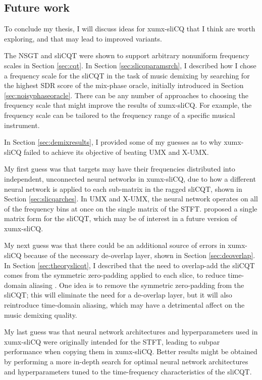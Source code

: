 \documentclass[report.tex]{subfiles}
\begin{document}
\subsection{Future work}

\begin{shaded}

To conclude my thesis, I will discuss ideas for xumx-sliCQ that I think are worth exploring, and that may lead to improved variants.

The NSGT and sliCQT were shown to support arbitrary nonuniform frequency scales in Section \ref{sec:cqt}. In Section \ref{sec:slicqparamsrch}, I described how I chose a frequency scale for the sliCQT in the task of music demixing by searching for the highest SDR score of the mix-phase oracle, initially introduced in Section \ref{sec:noisyphaseoracle}. There can be any number of approaches to choosing the frequency scale that might improve the results of xumx-sliCQ. For example, the frequency scale can be tailored to the frequency range of a specific musical instrument.

In Section \ref{sec:demixresults}, I provided some of my guesses as to why xumx-sliCQ failed to achieve its objective of beating UMX and X-UMX.

My first guess was that targets may have their frequencies distributed into independent, unconnected neural networks in xumx-sliCQ, due to how a different neural network is applied to each sub-matrix in the ragged sliCQT, shown in Section \ref{sec:slicqarches}. In UMX and X-UMX, the neural network operates on all of the frequency bins at once on the single matrix of the STFT. \textcite{variableq1} proposed a single matrix form for the sliCQT, which may be of interest in a future version of xumx-sliCQ.

My next guess was that there could be an additional source of errors in xumx-sliCQ because of the necessary de-overlap layer, shown in Section \ref{sec:deoverlap}. In Section \ref{sec:theoryslicqt}, I described that the need to overlap-add the sliCQT comes from the symmetric zero-padding applied to each slice, to reduce time-domain aliasing \parencite{slicq}. One idea is to remove the symmetric zero-padding from the sliCQT; this will eliminate the need for a de-overlap layer, but it will also reintroduce time-domain aliasing, which may have a detrimental affect on the music demixing quality.

My last guess was that neural network architectures and hyperparameters used in xumx-sliCQ were originally intended for the STFT, leading to subpar performance when copying them in xumx-sliCQ. Better results might be obtained by performing a more in-depth search for optimal neural network architectures and hyperparameters tuned to the time-frequency characteristics of the sliCQT.

\end{shaded}
\end{document}
